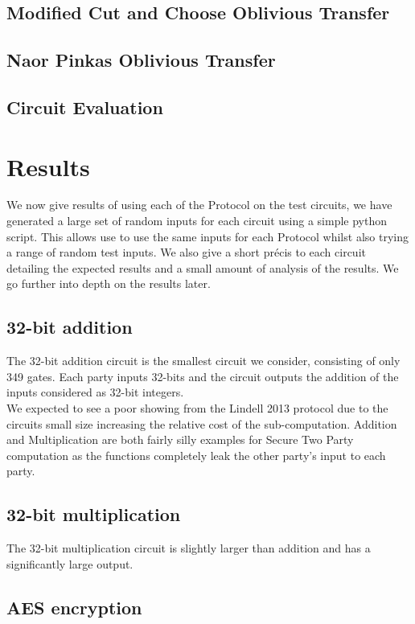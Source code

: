 \documentclass[ %
                    author={Nicholas Tutte},
                supervisor={Prof. Nigel Smart},
                    degree={MEng},
                     title={Secure Two Party Computation},
                  subtitle={A practical comparison of recent protocols},
                      type={Research - GG1K},
                      year={2015} ]{dissertation}
\begin{document}
			\subsection{Modified Cut and Choose Oblivious Transfer}

			\subsection{Naor Pinkas Oblivious Transfer}

			\subsection{Circuit Evaluation}

		\section{Results}
			We now give results of using each of the Protocol on the test circuits, we have generated a large set of random inputs for each circuit using a simple python script. This allows use to use the same inputs for each Protocol whilst also trying a range of random test inputs. We also give a short précis to each circuit detailing the expected results and a small amount of analysis of the results. We go further into depth on the results later.

			\subsection{32-bit addition}
				The 32-bit addition circuit is the smallest circuit we consider, consisting of only 349 gates. Each party inputs 32-bits and the circuit outputs the addition of the inputs considered as 32-bit integers.\\

				We expected to see a poor showing from the Lindell 2013 protocol due to the circuits small size increasing the relative cost of the sub-computation. Addition and Multiplication are both fairly silly examples for Secure Two Party computation as the functions completely leak the other party's input to each party. 

			\subsection{32-bit multiplication}

				The 32-bit multiplication circuit is slightly larger than addition and has a significantly large output.
			\subsection{AES encryption}
			
\end{document}
